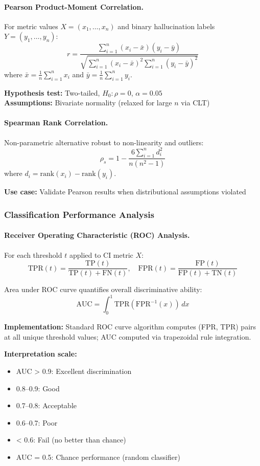 \paragraph{Pearson Product-Moment Correlation.} For metric values \(X = (x_1, \ldots, x_n)\) and binary hallucination labels \(Y = (y_1, \ldots, y_n)\):
\[
r = \frac{\sum_{i=1}^{n}(x_i - \bar{x})(y_i - \bar{y})}{\sqrt{\sum_{i=1}^{n}(x_i - \bar{x})^2 \sum_{i=1}^{n}(y_i - \bar{y})^2}}
\]
where \(\bar{x} = \frac{1}{n}\sum_{i=1}^{n}x_i\) and \(\bar{y} = \frac{1}{n}\sum_{i=1}^{n}y_i\).

\textbf{Hypothesis test:} Two-tailed, \(H_0: \rho = 0\), \(\alpha = 0.05\) \\
\textbf{Assumptions:} Bivariate normality (relaxed for large \(n\) via CLT)

\paragraph{Spearman Rank Correlation.} Non-parametric alternative robust to non-linearity and outliers:
\[
\rho_s = 1 - \frac{6\sum_{i=1}^{n}d_i^2}{n(n^2-1)}
\]
where \(d_i = \text{rank}(x_i) - \text{rank}(y_i)\).

\textbf{Use case:} Validate Pearson results when distributional assumptions violated

\subsubsection{Classification Performance Analysis}

\paragraph{Receiver Operating Characteristic (ROC) Analysis.} For each threshold \(t\) applied to CI metric \(X\):
\[
\text{TPR}(t) = \frac{\text{TP}(t)}{\text{TP}(t) + \text{FN}(t)}, \quad \text{FPR}(t) = \frac{\text{FP}(t)}{\text{FP}(t) + \text{TN}(t)}
\]

Area under ROC curve quantifies overall discriminative ability:
\[
\text{AUC} = \int_0^1 \text{TPR}(\text{FPR}^{-1}(x))\,dx
\]

\textbf{Implementation:} Standard ROC curve algorithm computes (FPR, TPR) pairs at all unique threshold values; AUC computed via trapezoidal rule integration.

\textbf{Interpretation scale:}
\begin{itemize}
    \item AUC > 0.9: Excellent discrimination
    \item 0.8--0.9: Good
    \item 0.7--0.8: Acceptable
    \item 0.6--0.7: Poor
    \item < 0.6: Fail (no better than chance)
    \item AUC = 0.5: Chance performance (random classifier)
\end{itemize}

